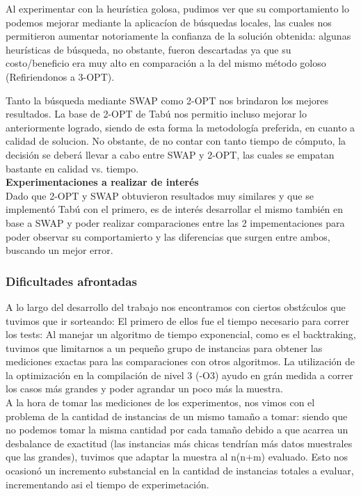 Al experimentar con la heurística golosa, pudimos ver que su comportamiento lo podemos mejorar mediante la aplicacíon de búsquedas locales, las cuales nos permitieron aumentar notoriamente la confianza de la solución obtenida: algunas heurísticas de búsqueda, no obstante, fueron descartadas ya que  su costo/beneficio era muy alto en comparación a la del mismo método goloso (Refiriendonos a 3-OPT). 

Tanto la búsqueda mediante SWAP como 2-OPT nos brindaron los mejores resultados. La base de 2-OPT de Tabú nos permitio incluso mejorar lo anteriormente logrado, siendo de esta forma la metodología preferida, en cuanto a calidad de solucion. No obstante, de no contar con tanto tiempo de cómputo, la decisi\'on se deberá llevar a cabo entre SWAP y 2-OPT, las cuales se empatan bastante en calidad vs. tiempo.\\

\textbf{Experimentaciones a realizar de interés}\\
Dado que 2-OPT y SWAP obtuvieron resultados muy similares y que se implementó Tabú con el primero, es de interés desarrollar el mismo también en base a SWAP y poder realizar comparaciones entre las 2 impementaciones para poder observar su comportamierto y las diferencias que surgen entre ambos, buscando un mejor error.


\subsubsection{Dificultades afrontadas}

A lo largo del desarrollo del trabajo nos encontramos con ciertos obstźculos que tuvimos que ir sorteando:
El primero de ellos fue el tiempo necesario para correr los tests: Al manejar un algoritmo de tiempo exponencial, como es el backtraking, tuvimos que limitarnos a un pequeño grupo de instancias para obtener las mediciones exactas para las comparaciones con otros algoritmos. La utilización de la optimización en la compilación de nivel 3 (-O3) ayudo en grán medida a correr los casos más grandes y poder agrandar un poco más la muestra.\\
A la hora de tomar las mediciones de los experimentos, nos vimos con el problema de la cantidad de instancias de un mismo tamaño a tomar: siendo que no podemos tomar la misma cantidad por cada tamaño debido a que acarrea un desbalance de exactitud (las instancias más chicas tendrían más datos muestrales que las grandes), tuvimos que adaptar la muestra al n(n+m) evaluado. Esto nos ocasionó un incremento substancial en la cantidad de instancias totales a evaluar, incrementando asi el tiempo de experimetación.

